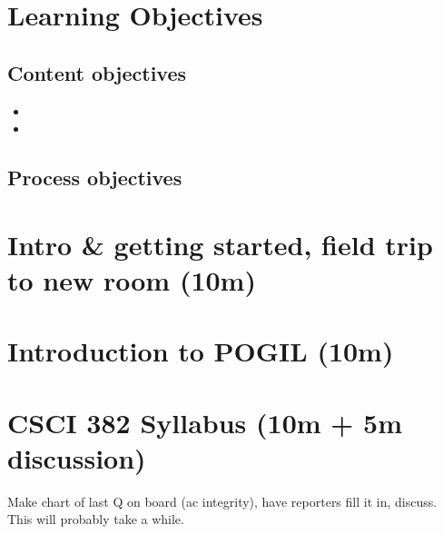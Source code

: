 \documentclass{tufte-handout}
\begin{document}
\section{Learning Objectives}

\subsection{Content objectives}

\begin{itemize}
\item \lobjectiveA
\item \lobjectiveB
\end{itemize}

\subsection{Process objectives}

\section{Intro \& getting started, field trip to new room (10m)}

\section{Introduction to POGIL (10m)}

\section{CSCI 382 Syllabus (10m + 5m discussion)}

Make chart of last Q on board (ac integrity), have reporters fill it
in, discuss.  This will probably take a while.
\end{document}
